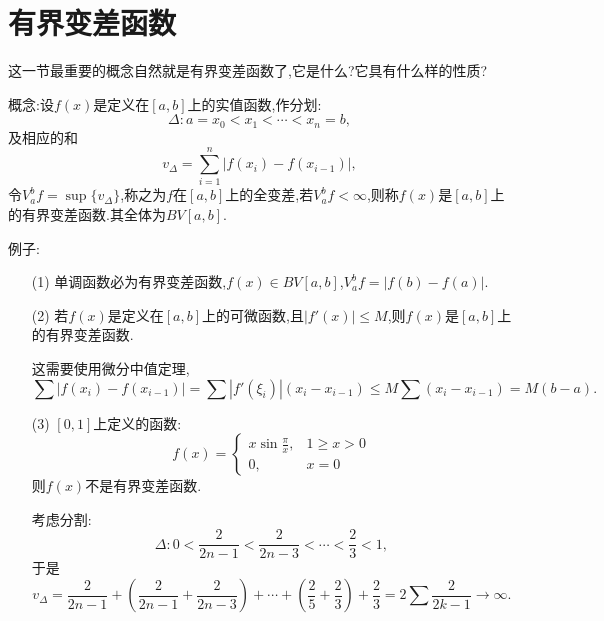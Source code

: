 \documentclass[12pt,a4paper,openany]{book}
\begin{document}
\section{有界变差函数}
这一节最重要的概念自然就是有界变差函数了,它是什么?它具有什么样的性质?

概念:设$f(x)$是定义在$[a,b]$上的实值函数,作分划:
\[
\Delta:a = x_0 <x_1<\cdots<x_n=b,
\]
及相应的和
\[
v_{\Delta} = \sum_{i=1}^{n}{|f(x_i) - f(x_{i-1})|},
\]
令$V_{a}^{b}{f} = \sup\{v_{\Delta}\}$,称之为$f$在$[a,b]$上的全变差,若$V_{a}^{b}{f}<\infty$,则称$f(x)$是$[a,b]$上的有界变差函数.其全体为$BV[a,b]$.

例子:

\begin{enumerate}
\item[(1)]单调函数必为有界变差函数,$f(x) \in BV[a,b]$,$V_{a}^{b}{f} = |f(b)-f(a)|$.

\item[(2)]若$f(x)$是定义在$[a,b]$上的可微函数,且$|f'(x)|\le M$,则$f(x)$是$[a,b]$上的有界变差函数.

这需要使用微分中值定理,
\[
\sum{|f(x_i) - f(x_{i-1})|} = \sum{|f'(\xi_i)|(x_i-x_{i-1})} \le M\sum{(x_i-x_{i-1})}=M(b-a).
\]

\item[(3)]$[0,1]$上定义的函数:
\[
f(x) = \begin{cases}
x\sin{\frac{\pi}{x}}, &1 \ge x > 0 \\
0, &x=0
\end{cases}
\]
则$f(x)$不是有界变差函数.

考虑分割:
\[\Delta:0<\frac{2}{2n-1} < \frac{2}{2n-3}<\cdots<\frac{2}{3}<1,\]
于是
\[
v_{\Delta} = \frac{2}{2n-1} + (\frac{2}{2n-1} + \frac{2}{2n-3}) + \cdots + (\frac{2}{5} + \frac{2}{3}) + \frac{2}{3} = 2\sum{\frac{2}{2k-1}} \rightarrow \infty.
\]
\end{enumerate}
\end{document}
